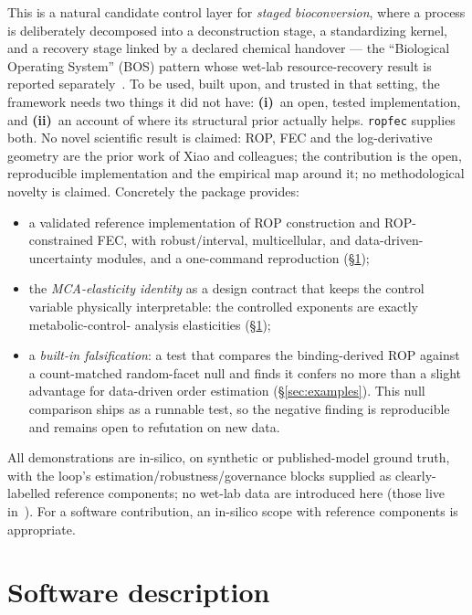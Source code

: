 \documentclass[11pt]{article}
\newcommand{\code}[1]{\texttt{#1}}
\begin{document}
This is a natural candidate control layer for \emph{staged bioconversion}, where a process
is deliberately decomposed into a deconstruction stage, a standardizing kernel, and a
recovery stage linked by a declared chemical handover --- the ``Biological Operating
System'' (BOS) pattern whose wet-lab resource-recovery result is reported
separately~\citep{paperA}. To be used, built upon, and trusted in that setting, the
framework needs two things it did not have: \textbf{(i)}~an open, tested implementation, and
\textbf{(ii)}~an account of where its structural prior actually helps. \code{ropfec}
supplies both. No novel scientific result is claimed: ROP, FEC and the log-derivative
geometry are the prior work of Xiao and colleagues; the contribution is the open,
reproducible implementation and the empirical map around it; no methodological novelty is claimed. Concretely the package provides:
\begin{itemize}\setlength\itemsep{1pt}
\item a validated reference implementation of ROP construction and ROP-constrained FEC, with
robust/interval, multicellular, and data-driven-uncertainty modules, and a one-command
reproduction (\S\ref{sec:desc});
\item the \emph{MCA-elasticity identity} as a design contract that keeps the control
variable physically interpretable: the controlled exponents are exactly metabolic-control-
analysis elasticities (\S\ref{sec:desc});
\item a \emph{built-in falsification}: a test that compares the binding-derived ROP against
a count-matched random-facet null and finds it confers no more than a slight advantage for
data-driven order estimation (\S\ref{sec:examples}). This null comparison ships as a runnable test, so
the negative finding is reproducible and remains open to refutation on new data.
\end{itemize}
All demonstrations are in-silico, on synthetic or published-model ground truth, with the
loop's estimation/robustness/governance blocks supplied as clearly-labelled reference
components; no wet-lab data are introduced here (those live in~\citep{paperA}). For a
software contribution, an in-silico scope with reference components is appropriate.

\section{Software description}\label{sec:desc}
\end{document}

